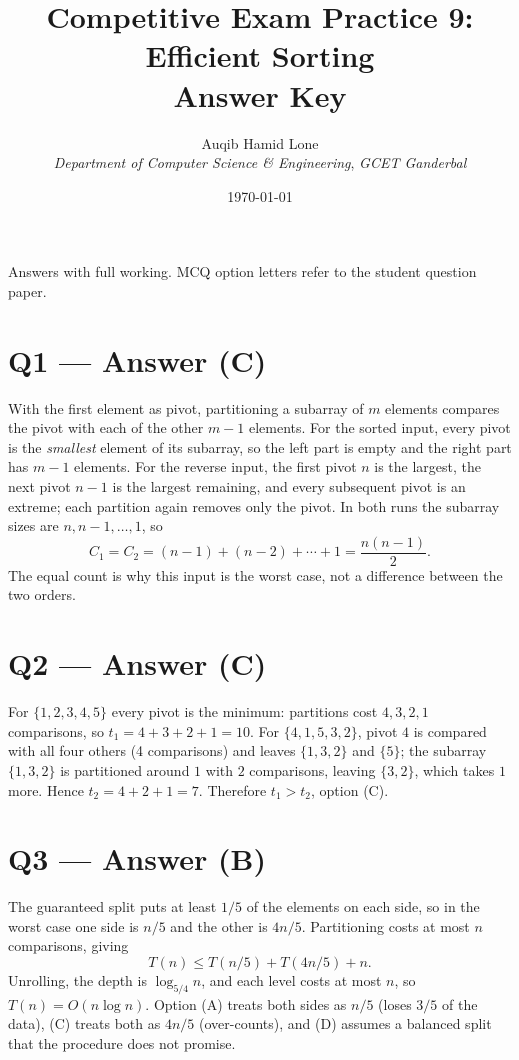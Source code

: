 \documentclass[11pt]{article}
\title{Competitive Exam Practice 9: Efficient Sorting\\\large Answer Key}
\author{Auqib Hamid Lone\\[0.3em]
  \emph{Department of Computer Science \& Engineering}, \emph{GCET Ganderbal}}
\date{\today}
\begin{document}
\maketitle

\noindent Answers with full working. MCQ option letters refer to the student question paper.

\section*{Q1 --- Answer (C)}

With the first element as pivot, partitioning a subarray of $m$ elements compares the pivot with each of the other $m-1$ elements. For the sorted input, every pivot is the \emph{smallest} element of its subarray, so the left part is empty and the right part has $m-1$ elements. For the reverse input, the first pivot $n$ is the largest, the next pivot $n-1$ is the largest remaining, and every subsequent pivot is an extreme; each partition again removes only the pivot. In both runs the subarray sizes are $n,n-1,\dots,1$, so
\[
  C_1 = C_2 = (n-1)+(n-2)+\cdots+1 = \frac{n(n-1)}{2}.
\]
The equal count is why this input is the worst case, not a difference between the two orders.

\section*{Q2 --- Answer (C)}

For $\{1,2,3,4,5\}$ every pivot is the minimum: partitions cost $4,3,2,1$ comparisons, so $t_1 = 4+3+2+1 = 10$. For $\{4,1,5,3,2\}$, pivot $4$ is compared with all four others (4 comparisons) and leaves $\{1,3,2\}$ and $\{5\}$; the subarray $\{1,3,2\}$ is partitioned around $1$ with $2$ comparisons, leaving $\{3,2\}$, which takes $1$ more. Hence $t_2 = 4+2+1 = 7$. Therefore $t_1 > t_2$, option (C).

\section*{Q3 --- Answer (B)}

The guaranteed split puts at least $1/5$ of the elements on each side, so in the worst case one side is $n/5$ and the other is $4n/5$. Partitioning costs at most $n$ comparisons, giving
\[
  T(n) \le T(n/5) + T(4n/5) + n.
\]
Unrolling, the depth is $\log_{5/4} n$, and each level costs at most $n$, so $T(n)=O(n\log n)$. Option (A) treats both sides as $n/5$ (loses $3/5$ of the data), (C) treats both as $4n/5$ (over-counts), and (D) assumes a balanced split that the procedure does not promise.
\end{document}
